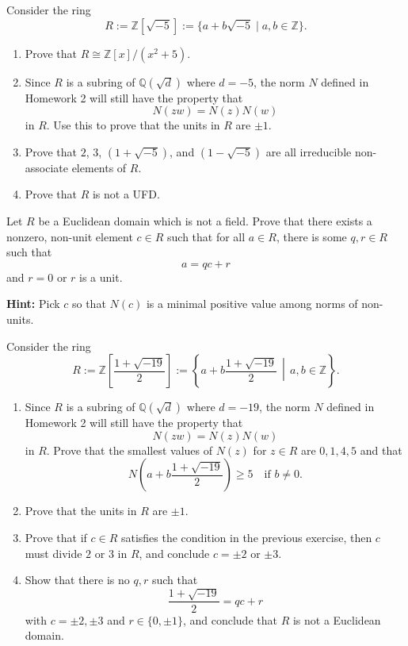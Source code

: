 \documentclass[addpoints,10pt]{exam}
\theoremstyle{plain}
\theoremstyle{definition}
\newtheorem{prob}[thm]{Problem}
\theoremstyle{plain}
\theoremstyle{plain}
\theoremstyle{definition}
\let\oldprob\prob
\let\endoldprob\endprob
\renewenvironment{prob}
  {\begin{singlespace}\oldprob}
  {\endoldprob\end{singlespace}}
\newcommand{\QQ}{\ensuremath{\mathbb{Q}}}
\newcommand{\ZZ}{\ensuremath{\mathbb{Z}}}
\newcommand{\tbf}[1]{\textbf{ #1 }}
\begin{document}
\newpage
\begin{prob}
Consider the ring
$$
R := \ZZ[\sqrt{-5}] := \{a + b\sqrt{-5} \mid a,b \in \ZZ\}.
$$
\begin{enumerate}[label=(\alph*)]
\item Prove that $R \cong \ZZ[x]/(x^2+5)$.
\item Since $R$ is a subring of $\QQ(\sqrt{d})$ where $d=-5$, the norm $N$ defined in Homework 2 will still have the property that
$$
N(zw)=N(z)N(w)
$$
in $R$. Use this to prove that the units in $R$ are $\pm 1$.
\item Prove that $2$, $3$, $(1+\sqrt{-5})$, and $(1-\sqrt{-5})$ are all irreducible non-associate elements of $R$.
\item Prove that $R$ is not a UFD.
\end{enumerate}
\end{prob}

\newpage
\begin{prob}
Let $R$ be a Euclidean domain which is not a field. Prove that there exists a nonzero, non-unit element $c \in R$ such that for all $a \in R$, there is some $q,r \in R$ such that
$$
a = qc + r
$$
and $r=0$ or $r$ is a unit.

\tbf{Hint:} Pick $c$ so that $N(c)$ is a minimal positive value among norms of non-units.
\end{prob}

\newpage
\begin{prob}
Consider the ring
$$
R := \ZZ\left[\frac{1+\sqrt{-19}}{2}\right]
:= \left\{a + b\frac{1+\sqrt{-19}}{2} \,\middle|\, a,b \in \ZZ\right\}.
$$
\begin{enumerate}[label=(\alph*)]
\item Since $R$ is a subring of $\QQ(\sqrt{d})$ where $d=-19$, the norm $N$ defined in Homework 2 will still have the property that
$$
N(zw)=N(z)N(w)
$$
in $R$. Prove that the smallest values of $N(z)$ for $z\in R$ are $0,1,4,5$ and that
$$
N\!\left(a + b\frac{1+\sqrt{-19}}{2}\right) \ge 5 \quad \text{if } b\ne 0.
$$
\item Prove that the units in $R$ are $\pm 1$.
\item Prove that if $c \in R$ satisfies the condition in the previous exercise, then $c$ must divide $2$ or $3$ in $R$, and conclude $c=\pm 2$ or $\pm 3$.
\item Show that there is no $q,r$ such that
$$
\frac{1+\sqrt{-19}}{2}=qc+r
$$
with $c=\pm 2,\pm 3$ and $r\in\{0,\pm 1\}$, and conclude that $R$ is not a Euclidean domain.
\end{enumerate}
\end{prob}
\end{document}
